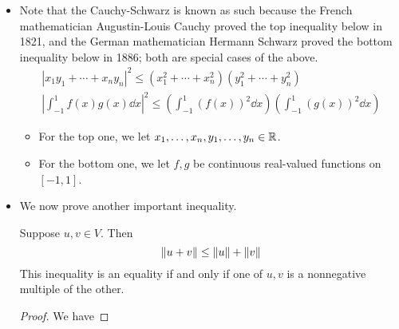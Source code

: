 \documentclass[../main.tex]{subfiles}
\begin{document}
\begin{itemize}
\begin{theorem}
\begin{proof}
\begin{align*}
                &= \frac{\inp{u}{v}}{\norm{v}^2}\overline{\frac{\inp{u}{v}}{\norm{v}^2}}\inp{v}{v}+\norm{w}^2\\
                &= \frac{\inp{u}{v}\overline{\inp{u}{v}}}{\norm{v}^4}\norm{v}^2+\norm{w}^2\\
                &= \frac{|\inp{u}{v}|^2}{\norm{v}^2}+\norm{w}^2\\
                &\geq \frac{|\inp{u}{v}|^2}{\norm{v}^2}
            \end{align*}
            Multiplying both sides by $\norm{v}^2$ and taking square roots gives the desired inequality.\par
            Also note that the Cauchy-Schwarz inequality is an equality iff the last line is an equality, which happens iff $w=0$. But $w=0$ iff $u$ is a scalar multiple of $v$, as desired.
        \end{proof}
    \end{theorem}
    \item Note that the Cauchy-Schwarz is known as such because the French mathematician Augustin-Louis Cauchy proved the top inequality below in 1821, and the German mathematician Hermann Schwarz proved the bottom inequality below in 1886; both are special cases of the above.
    \begin{gather*}
        |x_1y_1+\cdots+x_ny_n|^2 \leq (x_1^2+\cdots+x_n^2)(y_1^2+\cdots+y_n^2)\\
        \left| \int_{-1}^1f(x)g(x)\dd{x} \right|^2 \leq \left( \int_{-1}^1(f(x))^2\dd{x} \right)\left( \int_{-1}^1(g(x))^2\dd{x} \right)
    \end{gather*}
    \begin{itemize}
        \item For the top one, we let $x_1,\dots,x_n,y_1,\dots,y_n\in\mathbb{R}$.
        \item For the bottom one, we let $f,g$ be continuous real-valued functions on $[-1,1]$.
    \end{itemize}
    \item We now prove another important inequality.
    \begin{theorem}
        Suppose $u,v\in V$. Then
        \begin{equation*}
            \norm{u+v} \leq \norm{u}+\norm{v}
        \end{equation*}
        This inequality is an equality if and only if one of $u,v$ is a nonnegative multiple of the other.
        \begin{proof}
            We have

\end{proof}
\end{theorem}
\end{itemize}
\end{document}
